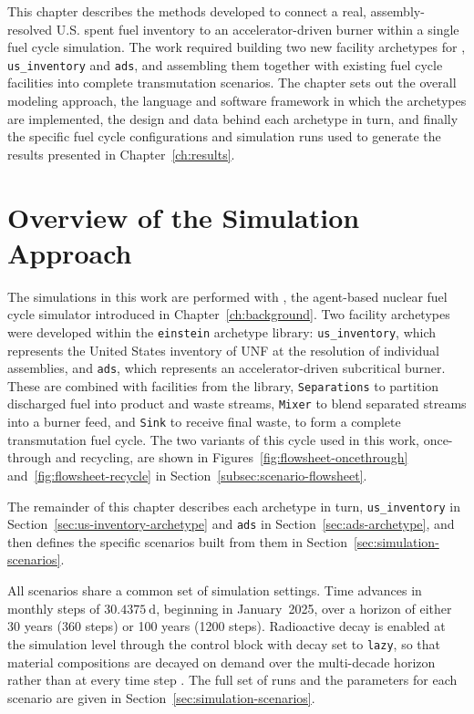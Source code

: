 This chapter describes the methods developed to connect a real,
assembly-resolved U.S. spent fuel inventory to an accelerator-driven burner
within a single fuel cycle simulation. The work required building two new
facility archetypes for \Cyclus, \texttt{us\_inventory} and \texttt{ads}, and
assembling them together with existing fuel cycle facilities into complete
transmutation scenarios. The chapter sets out the overall modeling approach,
the language and software framework in which the archetypes are implemented,
the design and data behind each archetype in turn, and finally the specific
fuel cycle configurations and simulation runs used to generate the results
presented in Chapter~\ref{ch:results}.

\section{Overview of the Simulation Approach}
\label{sec:method-overview}

The simulations in this work are performed with \Cyclus, the agent-based
nuclear fuel cycle simulator introduced in Chapter~\ref{ch:background}. Two
facility archetypes were developed within the \texttt{einstein} archetype
library: \texttt{us\_inventory}, which represents the United States inventory of
\gls{UNF} at the resolution of individual assemblies, and \texttt{ads}, which
represents an accelerator-driven subcritical burner. These are combined with
facilities from the \Cycamore library, \texttt{Separations} to partition
discharged fuel into product and waste streams, \texttt{Mixer} to blend separated
streams into a burner feed, and \texttt{Sink} to receive final waste, to form a
complete transmutation fuel cycle. The two variants of this cycle used in this
work, once-through and recycling, are shown in
Figures~\ref{fig:flowsheet-oncethrough} and~\ref{fig:flowsheet-recycle} in
Section~\ref{subsec:scenario-flowsheet}.

The remainder of this chapter describes each archetype in turn, 
\texttt{us\_inventory} in Section~\ref{sec:us-inventory-archetype} and
\texttt{ads} in Section~\ref{sec:ads-archetype}, and then defines the specific
scenarios built from them in Section~\ref{sec:simulation-scenarios}.

All scenarios share a common set of simulation settings. Time advances in
monthly steps of \(30.4375~\mathrm{d}\), beginning in January~2025, over a
horizon of either 30 years (360 steps) or 100 years (1200 steps). Radioactive
decay is enabled at the simulation level through the \Cyclus control block with
decay set to \texttt{lazy}, so that material compositions are decayed on demand
over the multi-decade horizon rather than at every time step
\cite{huff_fundamental_2016}. The full set of runs and the parameters for each scenario are given in
Section~\ref{sec:simulation-scenarios}.


